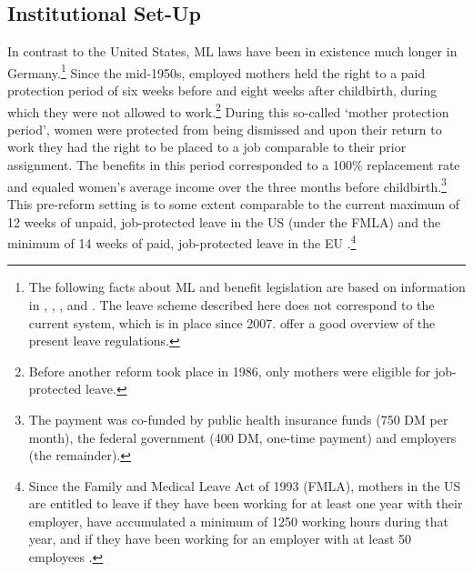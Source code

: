 \documentclass[11pt, a4paper, draft]{article} %
\begin{document}
\subsection[Reform]{Institutional Set-Up}
In contrast to the United States, ML laws have been in existence much longer in Germany.\footnote{The following facts about ML and benefit legislation are based on information in \cite{DIW2002}, \cite{schonberg2014expansions}, \cite{Dustmann2012}, and \cite{zmarzlik1999mutterschutzgesetz}. The leave scheme described here does not correspond to the current system, which is in place since 2007. \cite{Kluve2013} offer a good overview of the present leave regulations.} Since the mid-1950s, employed mothers held the right to a paid protection period of six weeks before and eight weeks after childbirth, during which they were not allowed to work.\footnote{Before another reform took place in 1986, only mothers were eligible for job-protected leave.} During this so-called `mother protection period', women were protected from being dismissed and upon their return to work they had the right to be placed
to a job comparable to their prior assignment. The benefits in this period corresponded to a 100\% replacement rate and equaled women's average income over the three months before childbirth.\footnote{The payment was co-funded by public health insurance funds (750 DM per month), the federal government (400 DM, one-time payment) and employers (the remainder).} This pre-reform setting is to some extent comparable to the current maximum of 12 weeks of unpaid, job-protected leave in the US (under the FMLA) and the minimum of 14 weeks of paid, job-protected leave in the EU \citep{guertzgen2018}.\footnote{Since the Family and Medical Leave Act of 1993 (FMLA), mothers in the US are entitled to leave if they have been working for at least one year with their employer, have accumulated a minimum of 1250 working hours during that year, and if they have been working for an employer with at least 50 employees \citep{baum2003effect}.} 
\end{document}

